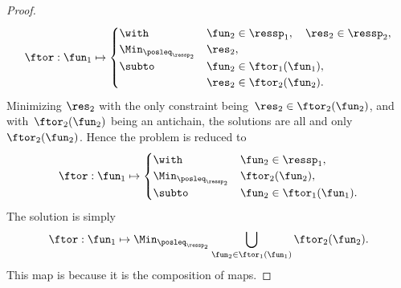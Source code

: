 \begin{proof}
\begin{equation}
\ftor:\fun_{1}\mapsto\begin{cases}
\with & \fun_{2}\in\ressp_{1},\quad\res_{2}\in\ressp_{2},\\
\Min_{\posleq_{\ressp_{2}}} & \res_{2},\\
\subto & \fun_{2}\in\ftor_{1}(\fun_{1}),\\
 & \res_{2}\in\ftor_{2}(\fun_{2}).
\end{cases}\label{eq:dede-2}
\end{equation}
Minimizing $\res_{2}$ with the only constraint being~$\res_{2}\in\ftor_{2}(\fun_{2})$,
and with~$\ftor_{2}(\fun_{2})$ being an antichain, the solutions
are all and only~$\ftor_{2}(\fun_{2})$. Hence the problem is reduced
to
\begin{equation}
\ftor:\fun_{1}\mapsto\begin{cases}
\with & \fun_{2}\in\ressp_{1},\\
\Min_{\posleq_{\ressp_{2}}} & \ftor_{2}(\fun_{2}),\\
\subto & \fun_{2}\in\ftor_{1}(\fun_{1}).
\end{cases}\label{eq:dede-2-1}
\end{equation}
The solution is simply
\begin{equation}
\ftor:\fun_{1}\mapsto\Min_{\posleq_{\ressp_{2}}}\bigcup_{\fun_{2}\in\ftor_{1}(\fun_{1})}\ftor_{2}(\fun_{2}).\label{eq:ora}
\end{equation}
This map is \scottcontinuous because it is the composition of \scottcontinuous
maps.
\end{proof}


